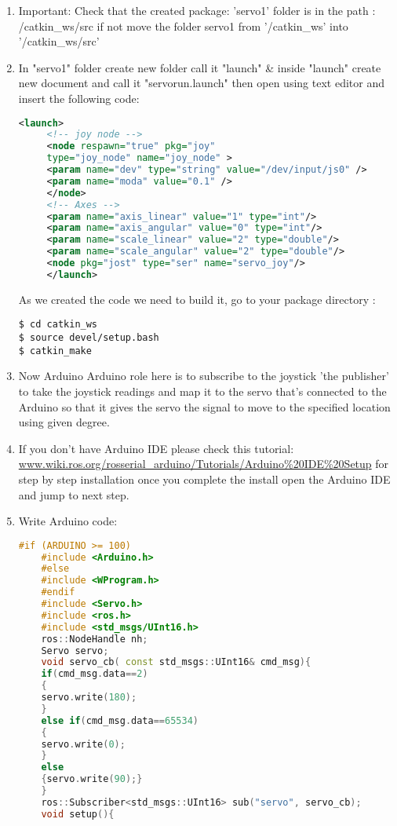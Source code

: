 \begin{enumerate}
     \item Important: Check that the created package: 'servo1' folder is in the path : /catkin\_ws/src
 	if not move the folder servo1 from '/catkin\_ws' into '/catkin\_ws/src'
 	
     \item In "servo1" folder create new folder call it "launch" \& inside "launch" create new document and call it "servorun.launch" then open using text editor and insert the following code:\\
     \begin{lstlisting}[language=XML]
     <launch>
     <!-- joy node -->
     <node respawn="true" pkg="joy"
     type="joy_node" name="joy_node" >
     <param name="dev" type="string" value="/dev/input/js0" />
     <param name="moda" value="0.1" />
     </node>
     <!-- Axes -->
     <param name="axis_linear" value="1" type="int"/>
     <param name="axis_angular" value="0" type="int"/>
     <param name="scale_linear" value="2" type="double"/>
     <param name="scale_angular" value="2" type="double"/>
     <node pkg="jost" type="ser" name="servo_joy"/>
     </launch>
     \end{lstlisting}
 	As we created the code we need to build it, go to your package directory : 
     \begin{lstlisting}[language=terCmd]
$ cd catkin_ws
$ source devel/setup.bash
$ catkin_make
     \end{lstlisting}

     \item Now Arduino
 	Arduino role here is to subscribe to the joystick 'the publisher' to take the joystick readings and map it to the servo that's connected to the Arduino so that it gives the servo the signal to move to the specified location using given degree.
 	\item If you don't have Arduino IDE please check this tutorial: \url{www.wiki.ros.org/rosserial_arduino/Tutorials/Arduino%20IDE%20Setup}
 	for step by step installation once you complete the install open the Arduino IDE and jump to next step.
 	\item Write Arduino code:
 		\begin{lstlisting}[language=CPP]
 	#if (ARDUINO >= 100)
 	#include <Arduino.h>
 	#else
 	#include <WProgram.h>
 	#endif
 	#include <Servo.h>
 	#include <ros.h>
 	#include <std_msgs/UInt16.h>
 	ros::NodeHandle nh;
 	Servo servo;
 	void servo_cb( const std_msgs::UInt16& cmd_msg){
 	if(cmd_msg.data==2)
 	{
 	servo.write(180);
 	}
 	else if(cmd_msg.data==65534)
 	{
 	servo.write(0);
 	}
 	else
 	{servo.write(90);}
 	}
 	ros::Subscriber<std_msgs::UInt16> sub("servo", servo_cb);
 	void setup(){
 	

\end{lstlisting}
\end{enumerate}
